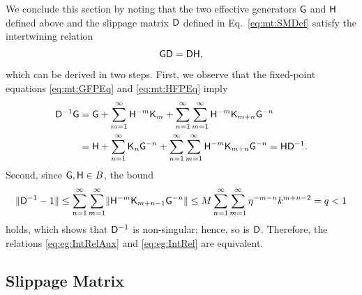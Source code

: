 \documentclass[aps,prl,reprint]{revtex4-2}
\begin{document}
We conclude this section by noting that the two effective generators $\mathsf{G}$ and $\mathsf{H}$ defined above and the slippage matrix $\mathsf{D}$ defined in Eq.~\eqref{eq:mt:SMDef} satisfy the intertwining relation
\begin{equation}\label{eq:eg:IntRel}
\mathsf{G}\mathsf{D} = \mathsf{D}\mathsf{H},
\end{equation}
which can be derived in two steps.
First, we observe that the fixed-point equations \eqref{eq:mt:GFPEq} and \eqref{eq:mt:HFPEq} imply
\begin{align}\label{eq:eg:IntRelAux}
\mathsf{D}^{-1}\mathsf{G} & = \mathsf{G} + \sum_{m=1}^\infty\mathsf{H}^{-m}\mathsf{K}_m + \sum_{n=1}^\infty\sum_{m=1}^\infty
\mathsf{H}^{-m}\mathsf{K}_{m+n}\mathsf{G}^{-n}\\
& = \mathsf{H} + \sum_{n=1}^\infty\mathsf{K}_n\mathsf{G}^{-n}  + \sum_{n=1}^\infty\sum_{m=1}^\infty
\mathsf{H}^{-m}\mathsf{K}_{m+n}\mathsf{G}^{-n}
= \mathsf{H}\mathsf{D}^{-1}. \nonumber
\end{align}
Second, since $\mathsf{G},\mathsf{H}\in B$, the bound
\begin{align}
\label{eq:eg:DBnd}
\lVert \mathsf{D}^{-1}-1 \rVert \leq \sum_{n=1}^\infty\sum_{m=1}^\infty\lVert \mathsf{H}^{-m}\mathsf{K}_{m+n-1}\mathsf{G}^{-n} \rVert \leq M \sum_{n=1}^\infty\sum_{m=1}^\infty \eta^{-m-n}k^{m+n-2} = q <1
\end{align}
holds, which shows that $\mathsf{D}^{-1}$ is non-singular; hence, so is $\mathsf{D}$.
Therefore, the relations \eqref{eq:eg:IntRelAux} and \eqref{eq:eg:IntRel} are equivalent.

\subsection{Slippage Matrix}

\newcommand{\vphp}{\vphantom{\prime}}
\end{document}
